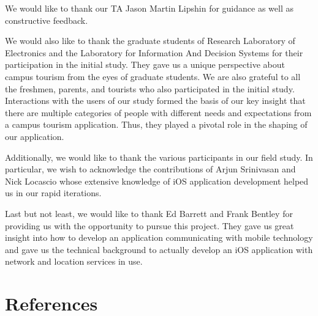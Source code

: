 \documentclass{sigchi}
\begin{document}
We would like to thank our TA Jason Martin Lipshin for guidance as well as constructive feedback. 

We would also like to thank the graduate students of Research Laboratory of Electronics and the Laboratory for Information And Decision Systems for their participation in the initial study. They gave us a unique perspective about campus tourism from the eyes of graduate students. We are also grateful to all the freshmen, parents, and tourists who also participated in the initial study. Interactions with the users of our study formed the basis of our key insight that there are multiple categories of people with different needs and expectations from a campus tourism application. Thus, they played a pivotal role in the shaping of our application. 

Additionally, we would like to thank the various participants in our field study. In particular, we wish to acknowledge the contributions of Arjun Srinivasan and Nick Locascio whose extensive knowledge of iOS application development helped us in our rapid iterations. 

Last but not least, we would like to thank Ed Barrett and Frank Bentley for providing us with the opportunity to pursue this project. They gave us great insight into how to develop an
application communicating with mobile technology and gave us the technical background to actually develop an iOS application with network and location services in use. 

%
%
%
%
%
\balance

\section{References}



\end{document}
